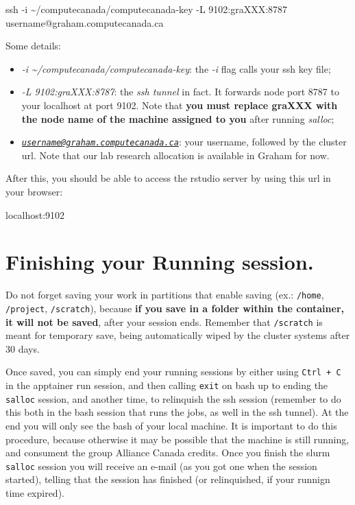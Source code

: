 \documentclass[
]{book}
\newenvironment{Shaded}{\begin{snugshade}}{\end{snugshade}}
\newcommand{\AttributeTok}[1]{\textcolor[rgb]{0.77,0.63,0.00}{#1}}
\newcommand{\ExtensionTok}[1]{#1}
\newcommand{\FunctionTok}[1]{\textcolor[rgb]{0.00,0.00,0.00}{#1}}
\newcommand{\NormalTok}[1]{#1}
\providecommand{\tightlist}{%
  \setlength{\itemsep}{0pt}\setlength{\parskip}{0pt}}
\begin{document}
\begin{Shaded}
\begin{Highlighting}[]
\FunctionTok{ssh} \AttributeTok{{-}i}\NormalTok{ \textasciitilde{}/computecanada/computecanada{-}key }\AttributeTok{{-}L}\NormalTok{ 9102:graXXX:8787 username@graham.computecanada.ca}
\end{Highlighting}
\end{Shaded}

Some details:

\begin{itemize}
\tightlist
\item
  \emph{-i \textasciitilde/computecanada/computecanada-key}: the \emph{-i} flag calls your ssh key file;
\item
  \emph{-L 9102:graXXX:8787}: the \emph{ssh tunnel} in fact. It forwards node port 8787 to your localhost at port 9102. Note that \textbf{you must replace graXXX with the node name of the machine assigned to you} after running \emph{salloc};
\item
  \emph{\href{mailto:username@graham.computecanada.ca}{\nolinkurl{username@graham.computecanada.ca}}}: your username, followed by the cluster url. Note that our lab research allocation is available in Graham for now.
\end{itemize}

After this, you should be able to access the rstudio server by using this url
in your browser:

\begin{Shaded}
\begin{Highlighting}[]
\ExtensionTok{localhost:9102}
\end{Highlighting}
\end{Shaded}

\hypertarget{finishing-your-running-session.}{%
\section{Finishing your Running session.}\label{finishing-your-running-session.}}

Do not forget saving your work in partitions that enable saving (ex.: \texttt{/home}, \texttt{/project}, \texttt{/scratch}), because \textbf{if you save in a folder within the container, it will not be saved}, after your session ends. Remember that \texttt{/scratch} is meant for temporary save, being automatically wiped by the cluster systems after 30 days.

Once saved, you can simply end your running sessions by either using \texttt{Ctrl\ +\ C} in the apptainer run session, and then calling \texttt{exit} on bash up to ending the \texttt{salloc} session, and another time, to relinquish the ssh session (remember to do this both in the bash session that runs the jobs, as well in the ssh tunnel). At the end you will only see the bash of your local machine. It is important to do this procedure, because otherwise it may be possible that the machine is still running, and consument the group Alliance Canada credits. Once you finish the slurm \texttt{salloc} session you will receive an e-mail (as you got one when the session started), telling that the session has finished (or relinquished, if your runnign time expired).
\end{document}
